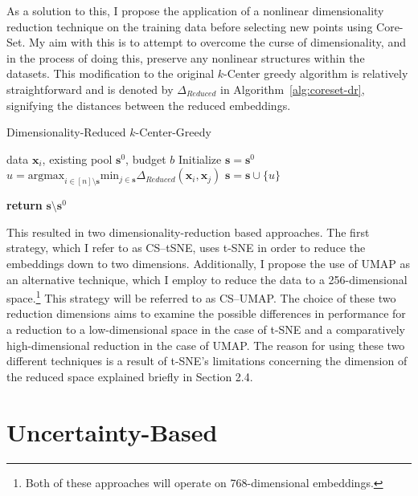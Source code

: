 \documentclass[english,bachelor,ul]{webisthesis} %
\begin{document}
As a solution to this, I propose the application of a nonlinear dimensionality reduction technique on the training data before selecting new points using Core-Set. My aim with this is to attempt to overcome the curse of dimensionality, and in the process of doing this, preserve any nonlinear structures within the datasets. This modification to the original $k$-Center greedy algorithm is relatively straightforward and is denoted by $ \Delta_{Reduced} $ in Algorithm~\ref{alg:coreset-dr}, signifying the distances between the reduced embeddings.

\begin{algorithm}[htpb]
\caption{Dimensionality-Reduced $k$-Center-Greedy}%
\label{alg:coreset-dr}
\begin{algorithmic}


\Require data $ \mathbf{x}_i $, existing pool $ \mathbf{s}^0 $, budget $ b $
\State Initialize $ \mathbf{s} = \mathbf{s}^0 $
\Repeat
\State $ u = \text{argmax}_{i \in [n] \setminus \mathbf{s}} \text{min}_{j \in \mathbf{s}} \Delta_{Reduced}(\mathbf{x}_i, \mathbf{x}_j) $
\State $ \mathbf{s} = \mathbf{s} \cup \{u\} $

\State \textbf{return} $\mathbf{s} \setminus \mathbf{s}^0 $
\end{algorithmic}
\end{algorithm}

This resulted in two dimensionality-reduction based approaches. The first strategy, which I refer to as CS--tSNE, uses t-SNE in order to reduce the embeddings down to two dimensions. Additionally, I propose the use of UMAP as an alternative technique, which I employ to reduce the data to a 256-dimensional space.\footnote{Both of these approaches will operate on 768-dimensional embeddings.} This strategy will be referred to as CS--UMAP. The choice of these two reduction dimensions aims to examine the possible differences in performance for a reduction to a low-dimensional space in the case of t-SNE and a comparatively high-dimensional reduction in the case of UMAP. The reason for using these two different techniques is a result of t-SNE's limitations concerning the dimension of the reduced space explained briefly in Section 2.4.

\section{Uncertainty-Based}
\end{document}
